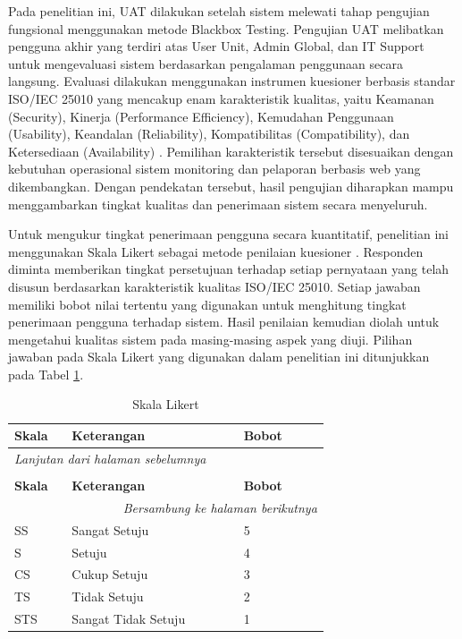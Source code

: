 Pada penelitian ini, UAT dilakukan setelah sistem melewati tahap pengujian fungsional menggunakan metode Blackbox Testing. Pengujian UAT melibatkan pengguna akhir yang terdiri atas User Unit, Admin Global, dan IT Support untuk mengevaluasi sistem berdasarkan pengalaman penggunaan secara langsung. Evaluasi dilakukan menggunakan instrumen kuesioner berbasis standar ISO/IEC 25010 yang mencakup enam karakteristik kualitas, yaitu Keamanan (Security), Kinerja (Performance Efficiency), Kemudahan Penggunaan (Usability), Keandalan (Reliability), Kompatibilitas (Compatibility), dan Ketersediaan (Availability) \cite{lamada2024iso}. Pemilihan karakteristik tersebut disesuaikan dengan kebutuhan operasional sistem monitoring dan pelaporan berbasis web yang dikembangkan. Dengan pendekatan tersebut, hasil pengujian diharapkan mampu menggambarkan tingkat kualitas dan penerimaan sistem secara menyeluruh. \par
Untuk mengukur tingkat penerimaan pengguna secara kuantitatif, penelitian ini menggunakan Skala Likert sebagai metode penilaian kuesioner \cite{lamada2024iso}. Responden diminta memberikan tingkat persetujuan terhadap setiap pernyataan yang telah disusun berdasarkan karakteristik kualitas ISO/IEC 25010. Setiap jawaban memiliki bobot nilai tertentu yang digunakan untuk menghitung tingkat penerimaan pengguna terhadap sistem. Hasil penilaian kemudian diolah untuk mengetahui kualitas sistem pada masing-masing aspek yang diuji. Pilihan jawaban pada Skala Likert yang digunakan dalam penelitian ini ditunjukkan pada Tabel \ref{table:2.likert}. \par

\begin{longtable}{|p{0.10\linewidth}|p{0.40\linewidth}|p{0.20\linewidth}|}
    \caption{Skala Likert}
    \label{table:2.likert}\\
    \hline
    \textbf{Skala} & \textbf{Keterangan} & \textbf{Bobot} \\
    \hline
    \endfirsthead
    \multicolumn{3}{l}{\textit{Lanjutan dari halaman sebelumnya}} \\
    \caption[]{Skala Likert} \\
    \hline
    \textbf{Skala} & \textbf{Keterangan} & \textbf{Bobot} \\
    \hline
    \endhead
    \hline
    \multicolumn{3}{r}{\textit{Bersambung ke halaman berikutnya}} \\
    \endfoot
    \endlastfoot
    SS  & Sangat Setuju       & 5 \\
    \hline
    S   & Setuju              & 4 \\
    \hline
    CS  & Cukup Setuju        & 3 \\
    \hline
    TS  & Tidak Setuju        & 2 \\
    \hline
    STS & Sangat Tidak Setuju & 1 \\
    \hline
\end{longtable}

